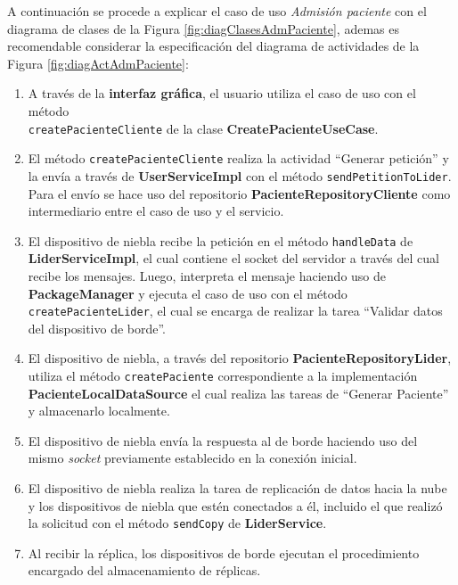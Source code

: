 A continuación se procede a explicar el caso de uso \textit{Admisión paciente} con el diagrama de clases de la Figura \ref{fig:diagClasesAdmPaciente}, ademas es recomendable considerar la especificación del diagrama de actividades de la Figura \ref{fig:diagActAdmPaciente}:

\begin{enumerate}
    \item A través de la \textbf{interfaz gráfica}, el usuario utiliza el caso de uso con el método\\ \texttt{createPacienteCliente} de la clase \textbf{CreatePacienteUseCase}.
    
    \item El método \texttt{createPacienteCliente} realiza la actividad ``Generar petición'' y la envía a través de \textbf{UserServiceImpl} con el método \texttt{sendPetitionToLider}. Para el envío se hace uso del repositorio \textbf{PacienteRepositoryCliente} como intermediario entre el caso de uso y el servicio.

    \item El dispositivo de niebla recibe la petición en el método \texttt{handleData} de \textbf{LiderServiceImpl}, el cual contiene el socket del servidor a través del cual recibe los mensajes. Luego, interpreta el mensaje haciendo uso de \textbf{PackageManager} y ejecuta el caso de uso con el método\\ \texttt{createPacienteLider}, el cual se encarga de realizar la tarea ``Validar datos del dispositivo de borde''.

    \item El dispositivo de niebla, a través del repositorio \textbf{PacienteRepositoryLider}, utiliza el método \texttt{createPaciente} correspondiente a la implementación \textbf{PacienteLocalDataSource} el cual realiza las tareas de ``Generar Paciente'' y almacenarlo localmente.

    \item El dispositivo de niebla envía la respuesta al de borde haciendo uso del mismo \textit{socket} previamente establecido en la conexión inicial.

    \item El dispositivo de niebla realiza la tarea de replicación de datos hacia la nube y los dispositivos de niebla que estén conectados a él, incluido el que realizó la solicitud con el método \texttt{sendCopy} de \textbf{LiderService}.

    \item Al recibir la réplica, los dispositivos de borde ejecutan el procedimiento encargado del almacenamiento de réplicas.
    
\end{enumerate}





